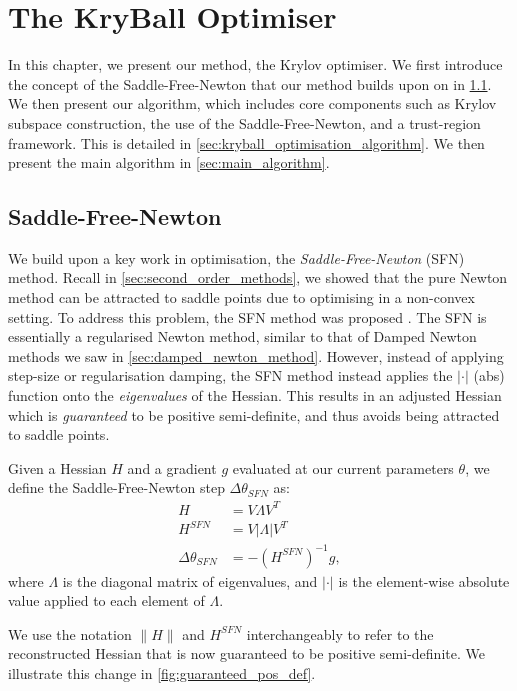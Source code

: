 \chapter{The KryBall Optimiser}
\label{chap:method}

In this chapter, we present our method, the Krylov optimiser. We first introduce the concept of the Saddle-Free-Newton that our method builds upon on in \cref{sec:saddle_free_newton}. We then present our algorithm, which includes core components such as Krylov subspace construction, the use of the Saddle-Free-Newton, and a trust-region framework. This is detailed in \cref{sec:kryball_optimisation_algorithm}. We then present the main algorithm in \cref{sec:main_algorithm}.

\section{Saddle-Free-Newton}
\label{sec:saddle_free_newton}

We build upon a key work in optimisation, the \textit{Saddle-Free-Newton} (SFN) method. Recall in \cref{sec:second_order_methods}, we showed that the pure Newton method can be attracted to saddle points due to optimising in a non-convex setting. To address this problem, the SFN method was proposed \citep{dauphin2014sfn}. The SFN is essentially a regularised Newton method, similar to that of Damped Newton methods we saw in \cref{sec:damped_newton_method}. However, instead of applying step-size or regularisation damping, the SFN method instead applies the $|\cdot|$ (abs) function onto the \textit{eigenvalues} of the Hessian. This results in an adjusted Hessian which is \textit{guaranteed} to be positive semi-definite, and thus avoids being attracted to saddle points. 

\begin{definition}
    Given a Hessian $H$ and a gradient $g$ evaluated at our current parameters $\theta$, we define the Saddle-Free-Newton step $\Delta \theta_{SFN}$ as:
    \begin{align}
        H &= V \Lambda V^T \\
        H^{SFN} &= V |\Lambda| V^T \\
        \Delta \theta_{SFN} &= -(H^{SFN})^{-1} g,
    \end{align}
    where $\Lambda$ is the diagonal matrix of eigenvalues, and $|\cdot|$ is the element-wise absolute value applied to each element of $\Lambda$.
\end{definition}
We use the notation $\| H \|$ and $H^{SFN}$ interchangeably to refer to the reconstructed Hessian that is now guaranteed to be positive semi-definite. We illustrate this change in \cref{fig:guaranteed_pos_def}.

